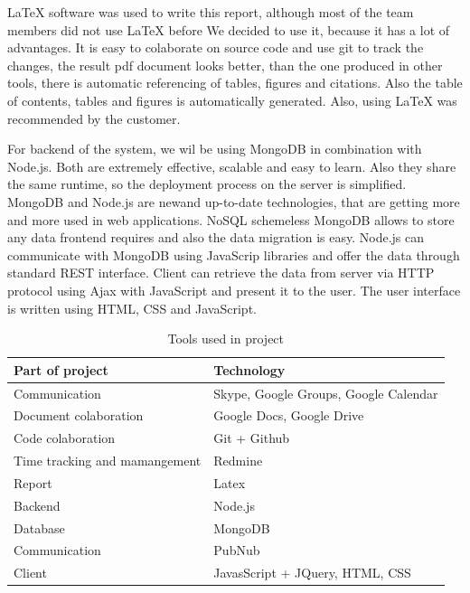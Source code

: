 LaTeX software was used to write this report, although most of the team members did not use LaTeX before We decided to use it, because it has a lot of advantages. It is easy to colaborate on source code and use git to track the changes, the result pdf document looks better, than the one produced in other tools, there is automatic referencing of tables, figures and citations. Also the table of contents, tables and figures is automatically generated. Also, using LaTeX was recommended by the customer.

For backend of the system, we wil be using MongoDB in combination with Node.js. Both are extremely effective, scalable and easy to learn. Also they share the same runtime, so the deployment process on the server is simplified. MongoDB and Node.js are newand up-to-date technologies, that are getting more and more used in web applications. NoSQL schemeless MongoDB allows to store any data frontend requires and also the data migration is easy. Node.js can communicate with MongoDB using JavaScrip libraries and offer the data through standard REST interface. Client can retrieve the data from server via HTTP protocol using Ajax with JavaScript and present it to the user. The user interface is written using HTML, CSS and JavaScript.

\begin{table}
\centering
\begin{tabular}{ l l}
\textbf{Part of project}  & \textbf{Technology} \\
\hline
Communication & Skype, Google Groups, Google Calendar \\
Document colaboration & Google Docs, Google Drive \\
Code colaboration & Git + Github \\
Time tracking and mamangement & Redmine \\
Report & Latex \\
Backend & Node.js \\
Database & MongoDB \\
Communication & PubNub \\
Client & JavasScript + JQuery, HTML, CSS \\
\hline
\end{tabular}
\caption{Tools used in project}
\label{table-tools}
\end{table}

